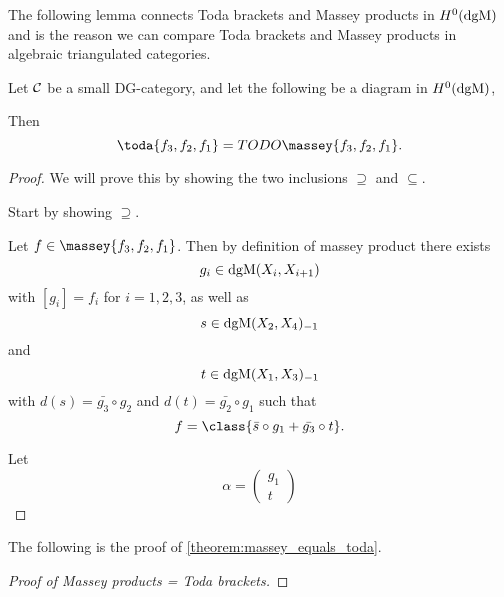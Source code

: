 

The following lemma connects Toda brackets and Massey products in \( H^0(\operatorname{dgM}) \) and is the reason we can compare Toda brackets and Massey products in algebraic triangulated categories.

\begin{lemma}
    Let \( {\mathcal{C}} \) be a small DG-category, and let the following be a diagram in \( H^0(\operatorname{dgM}) \),
    \begin{center}
    \end{center}
    Then
    \[
        \toda{f_3, f_2, f_1} = TODO\massey{f_3, f_2, f_1}.
    \]
\end{lemma}
\begin{proof}
    We will prove this by showing the two inclusions \( \supseteq \) and \( \subseteq \).

    Start by showing \( \supseteq \).

    Let \( f \in \massey{f_3, f_2, f_1} \). Then by definition of massey product there exists
    \[
        g_i \in \operatorname{dgM}(X_i, X_{i + 1})
    \]
    with \( [g_i] = f_i \) for \( i = 1, 2, 3 \), as well as
    \[
        s \in \operatorname{dgM}(X_2, X_4)_{-1}
    \]
    and
    \[
        t \in \operatorname{dgM}(X_1, X_3)_{-1}
    \]
    with \( d(s) = \bar{g_3} \circ g_2 \) and \( d(t) = \bar{g_2} \circ g_1 \) such that
    \[
        f = \class{\bar{s} \circ g_1 + \bar{g_3} \circ t}.
    \]

    Let
    \[
        \alpha =
        \begin{pmatrix}
            g_1 \\
            t
        \end{pmatrix}
    \]
\end{proof}

The following is the proof of \autoref*{theorem:massey_equals_toda}.

\begin{proof}[Proof of Massey products = Toda brackets]
    
\end{proof}